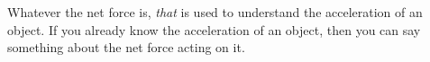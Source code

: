 \documentclass[12pt]{report}
\begin{document}
\hfill \parbox{6cm}{Whatever the net force is, \emph{that} is used to understand the acceleration of an object.  If you already know the acceleration of an object, then you can say something about the net force acting on it.}   \hspace{7cm}
\end{document}
